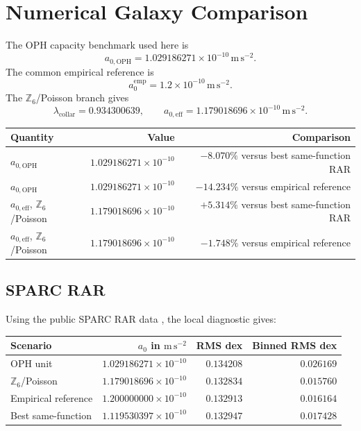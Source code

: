 \documentclass[11pt]{article}
\newcommand{\aoph}{a_{0,\mathrm{OPH}}}
\newcommand{\aeff}{a_{0,\mathrm{eff}}}
\newcommand{\lambdac}{\lambda_{\mathrm{collar}}}
\newcommand{\Zsix}{\mathbb Z_6}
\begin{document}
\section{Numerical Galaxy Comparison}

The OPH capacity benchmark used here is
\begin{equation}
  \aoph = 1.029186271\times10^{-10}\,\mathrm{m\,s^{-2}}.
\end{equation}
The common empirical reference is
\begin{equation}
  a_0^{\mathrm{emp}}=1.2\times10^{-10}\,\mathrm{m\,s^{-2}}.
\end{equation}
The \(\Zsix\)/Poisson branch gives
\begin{equation}
  \lambdac=0.934300639,
  \qquad
  \aeff=1.179018696\times10^{-10}\,\mathrm{m\,s^{-2}}.
\end{equation}

\begin{center}
\begin{tabular}{@{}lrr@{}}
\toprule
Quantity & Value & Comparison \\
\midrule
\(\aoph\) &
\(1.029186271\times10^{-10}\) &
\(-8.070\%\) versus best same-function RAR \\
\(\aoph\) &
\(1.029186271\times10^{-10}\) &
\(-14.234\%\) versus empirical reference \\
\(\aeff\), \(\Zsix\)/Poisson &
\(1.179018696\times10^{-10}\) &
\(+5.314\%\) versus best same-function RAR \\
\(\aeff\), \(\Zsix\)/Poisson &
\(1.179018696\times10^{-10}\) &
\(-1.748\%\) versus empirical reference \\
\bottomrule
\end{tabular}
\end{center}

\subsection{SPARC RAR}

Using the public SPARC RAR data \cite{sparcpage,mcgaugh2016}, the local
diagnostic gives:
\begin{center}
\begin{tabular}{@{}lrrr@{}}
\toprule
Scenario & \(a_0\) in \(\mathrm{m\,s^{-2}}\) & RMS dex & Binned RMS dex \\
\midrule
OPH unit & \(1.029186271\times10^{-10}\) & \(0.134208\) & \(0.026169\) \\
\(\Zsix\)/Poisson & \(1.179018696\times10^{-10}\) & \(0.132834\) & \(0.015760\) \\
Empirical reference & \(1.200000000\times10^{-10}\) & \(0.132913\) & \(0.016164\) \\
Best same-function & \(1.119530397\times10^{-10}\) & \(0.132947\) & \(0.017428\) \\
\bottomrule
\end{tabular}
\end{center}
\end{document}
